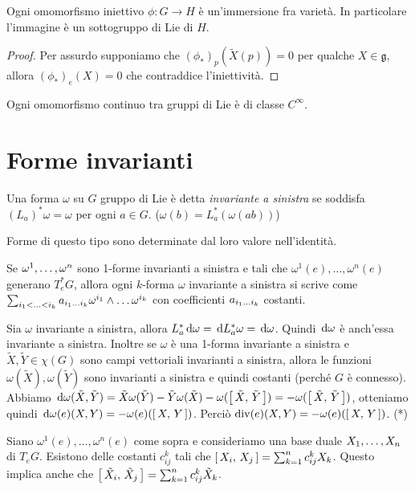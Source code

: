 \begin{corollary}
	Ogni omomorfismo iniettivo $\phi : G \to H$ è un'immersione fra varietà. In particolare l'immagine è un sottogruppo di Lie di $H$.
\end{corollary}
\begin{proof}
	Per assurdo supponiamo che $(\phi_*)_p(\tilde X(p)) = 0$ per qualche $X \in \mathfrak g$, allora $(\phi_*)_e(X) = 0$ che contraddice l'iniettività.
\end{proof}


\begin{corollary}
	Ogni omomorfismo continuo tra gruppi di Lie è di classe $C^\infty$.
\end{corollary}



\section{Forme invarianti}

\begin{definition}
	Una forma $\omega$ su $G$ gruppo di Lie è detta \emph{invariante a sinistra} se soddisfa $(L_a)^*\omega = \omega$ per ogni $a \in G$. ($\omega(b) = L_a^*(\omega(ab))$)
\end{definition}

Forme di questo tipo sono determinate dal loro valore nell'identità.

Se $\seqa\omega n,$ sono 1-forme invarianti a sinistra e tali che $\omega^1(e),\ldots,\omega^n(e)$ generano $T_e^*G$, allora ogni $k$-forma $\omega$ invariante a sinistra si scrive come $\sum_{\seqb ik<} a_{\seqb ik{}} \omega^{i_1}\wedge \ldots \omega^{i_k}$ con coefficienti $a_{\seqb ik{}}$ costanti.

Sia $\omega$ invariante a sinistra, allora $L_a^*\de\omega = \de L_a^*\omega = \de \omega$. Quindi $\de\omega$ è anch'essa invariante a sinistra. 
Inoltre se $\omega$ è una 1-forma invariante a sinistra e $\tilde X,\tilde Y \in \chi(G)$ sono campi vettoriali invarianti a sinistra, allora le funzioni $\omega(\tilde X), \omega(\tilde Y)$ sono invarianti a sinistra e quindi costanti (perché $G$ è connesso).
Abbiamo $\de \omega (\tilde X, \tilde Y) = \tilde X \omega (\tilde Y) - \tilde Y \omega(\tilde X) - \omega(\comm {\tilde X}{\tilde Y}) = - \omega (\comm{\tilde X}{\tilde Y})$, otteniamo quindi $\de \omega (e) (X,Y) = - \omega(e) (\comm XY)$.
Perciò $\div(e)(X,Y) = -\omega(e)(\comm XY)$. (*)

Siano $\omega^1(e), \ldots, \omega^n(e)$ come sopra e consideriamo una base duale $\seqb Xn,$ di $T_eG$. Esistono delle costanti $c_{ij}^k$ tali che $\comm{X_i}{X_j} = \sum_{k=1}^n c_{ij}^k X_k$. Questo implica anche che $\comm{\tilde X_i}{\tilde X_j} = \sum_{k=1}^n c_{ij}^k \tilde X_k$.

